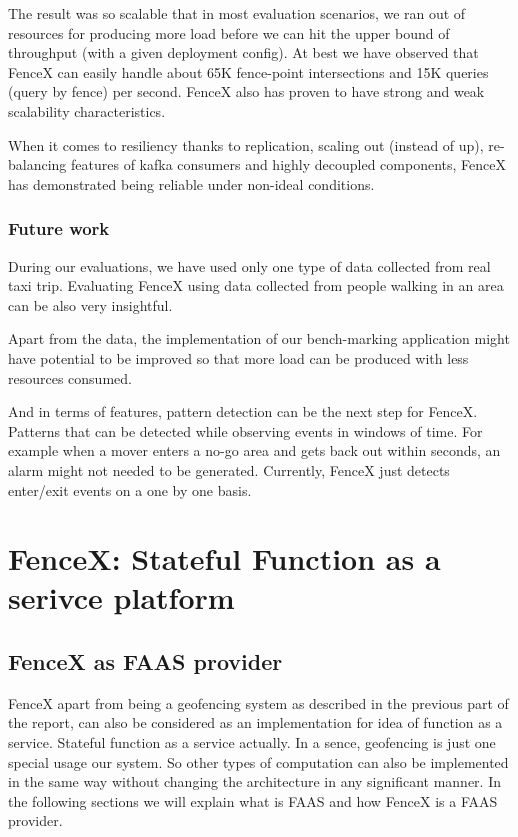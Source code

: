 \documentclass[a4]{report}
\begin{document}
    The result was so scalable that in most evaluation scenarios, we ran out of resources for producing more load
    before we can hit the upper bound of throughput (with a given deployment config).
    At best we have observed that FenceX can easily handle about 65K fence-point intersections and 15K queries (query by
    fence) per second.
    FenceX also has proven to have strong and weak scalability characteristics.

    When it comes to resiliency thanks to replication, scaling out (instead of up), re-balancing features of kafka
    consumers and highly decoupled components, FenceX has demonstrated being reliable under non-ideal conditions.


    \section{Future work}
    During our evaluations, we have used only one type of data collected from real taxi trip.
    Evaluating FenceX using data collected from people walking in an area can be also very insightful.

    Apart from the data, the implementation of our bench-marking application might have potential to be improved so
    that more load can be produced with less resources consumed.

    And in terms of features, pattern detection can be the next step for FenceX.
    Patterns that can be detected while observing events in windows of time.
    For example when a mover enters a no-go area and gets back out within seconds, an alarm might not needed to be
    generated.
    Currently, FenceX just detects enter/exit events on a one by one basis.



    \part[Stateful FAAS]{FenceX: Stateful Function as a serivce platform}


    \chapter{FenceX as FAAS provider}
    FenceX apart from being a geofencing system as described in the previous part of the report, can also be
    considered as an implementation for idea of function as a service.
    Stateful function as a service actually.
    In a sence, geofencing is just one special usage our system.
    So other types of computation can also be implemented in the same way without changing the architecture in any
    significant manner.
    In the following sections we will explain what is FAAS and how FenceX is a FAAS provider.
\end{document}
